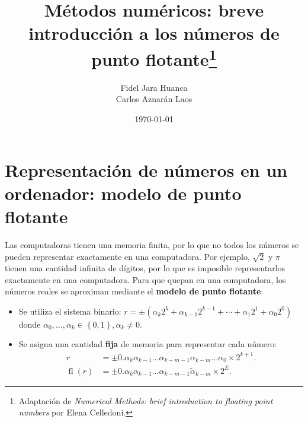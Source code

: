 \documentclass[a4paper,10pt]{scrartcl}
\title{
    Métodos numéricos:
    breve introducción a los números de punto flotante\thanks{
    Adaptación de
    \emph{Numerical Methods: brief introduction to floating point numbers}
    por Elena Celledoni.}
}
\author{
    Fidel Jara Huanca\\
    Carlos Aznarán Laos}
\date{\today}
\theoremstyle{definition}
\begin{document}
\maketitle

\section{Representación de números en un ordenador: modelo de punto flotante}

Las computadoras tienen una memoria finita, por lo que no todos los
números se pueden representar exactamente en una computadora.
Por ejemplo, $\sqrt{2}$ y $\pi$ tienen una cantidad infinita de
dígitos, por lo que es imposible representarlos exactamente en una
computadora.
Para que quepan en una computadora, los números reales se aproximan
mediante el \textbf{modelo de punto flotante}:

\begin{itemize}
    \item

          Se utiliza el sistema binario:
          \begin{math}
              r=\pm
              \left(
              \alpha_{k}2^{k}+
              \alpha_{k-1}2^{k-1}+
              \cdots+
              \alpha_{1}2^{1}+
              \alpha_{0}2^{0}
              \right)
          \end{math}
          donde
          \begin{math}
              \alpha_{0},\dotsc,\alpha_{k}\in
              \left\{0,1\right\},
              \alpha_{k}\neq 0.
          \end{math}

    \item

          Se asigna una cantidad \textbf{fija} de memoria para
          representar cada número:
          \begin{align*}
              r
               & =\pm
              0.
              \alpha_{k}\alpha_{k-1}\dotsc
              \alpha_{k-m-1}\alpha_{k-m}\dotsc
              \alpha_{0}\times 2^{k+1}. \\
              \operatorname{fl}
              \left(r\right)
               & =\pm
              0.
              \alpha_{k}\alpha_{k-1}\dotsc
              \alpha_{k-m-1}\widetilde{\alpha}_{k-m}\times
              2^{E}.
          \end{align*}
\end{itemize}
\end{document}
